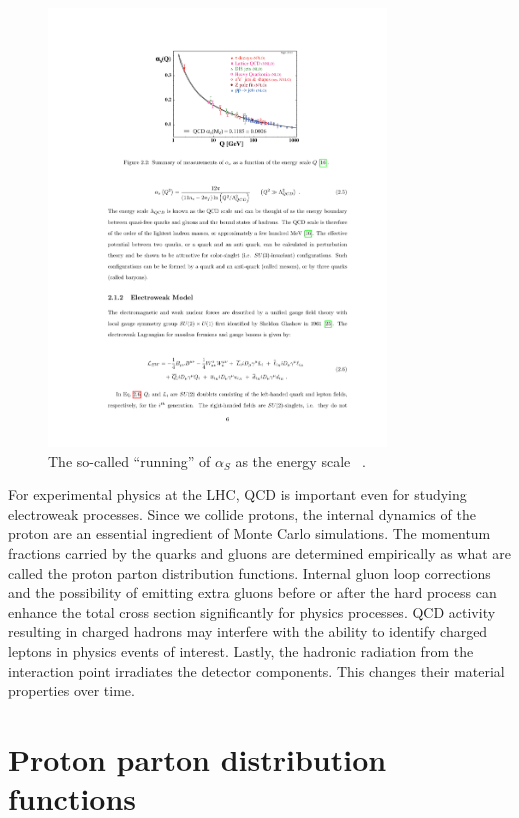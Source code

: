 \begin{figure}[!hbtp]
  \centering
    \includegraphics[width=0.80\textwidth]{figures/alphaS_running.pdf}
  \caption{The so-called ``running'' of $\alpha_S$ as the energy scale ~\cite{PhysRevD.98.030001}.} 
  \label{fig:alphaS}
\end{figure}

For experimental physics at the LHC, QCD is important even for studying electroweak processes.
Since we collide protons, the internal dynamics of the proton are an essential ingredient of Monte Carlo simulations.
The momentum fractions carried by the quarks and gluons are determined empirically as what are called the proton parton distribution functions.
Internal gluon loop corrections and the possibility of emitting extra gluons before or after the hard process can enhance the total cross section significantly for physics processes.
QCD activity resulting in charged hadrons may interfere with the ability to identify charged leptons in physics events of interest.
Lastly, the hadronic radiation from the interaction point irradiates the detector components. This changes their material properties over time.
\clearpage
\section{Proton parton distribution functions}

